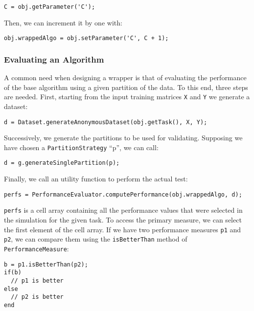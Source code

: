 \begin{lstlisting}
C = obj.getParameter('C');
\end{lstlisting}

\noindent Then, we can increment it by one with:

\begin{lstlisting}
obj.wrappedAlgo = obj.setParameter('C', C + 1);
\end{lstlisting}

\subsubsection{Evaluating an Algorithm}

A common need when designing a wrapper is that of evaluating the performance of the base algorithm using a given partition of the data. To this end, three steps are needed. First, starting from the input training matrices \verb|X| and \verb|Y| we generate a dataset:

\begin{lstlisting}
d = Dataset.generateAnonymousDataset(obj.getTask(), X, Y);
\end{lstlisting}

\noindent Successively, we generate the partitions to be used for validating. Supposing we have chosen a \verb|PartitionStrategy| ``p'', we can call:

\begin{lstlisting}
d = g.generateSinglePartition(p);
\end{lstlisting}

\noindent Finally, we call an utility function to perform the actual test:

\begin{lstlisting}
perfs = PerformanceEvaluator.computePerformance(obj.wrappedAlgo, d);
\end{lstlisting}

\noindent \verb|perfs| is a cell array containing all the performance values that were selected in the simulation for the given task. To access the primary measure, we can select the first element of the cell array. If we have two performance measures \verb|p1| and \verb|p2|, we can compare them using the \verb|isBetterThan| method of \verb|PerformanceMeasure|:

\begin{lstlisting}
b = p1.isBetterThan(p2);
if(b)
  // p1 is better
else
  // p2 is better
end
\end{lstlisting} 

